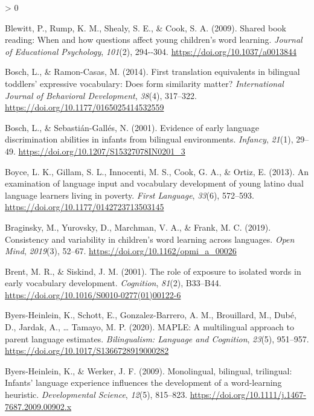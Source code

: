 \documentclass[
  english,
  ,man,floatsintext]{apa6}
\newlength{\cslhangindent}
\newenvironment{CSLReferences}[2] %
 {%
  \setlength{\parindent}{0pt}
  \ifodd #1 \everypar{\setlength{\hangindent}{\cslhangindent}}\ignorespaces\fi
  \ifnum #2 > 0
  \setlength{\parskip}{#2\baselineskip}
  \fi
 }%
 {}
\begin{document}
\begin{CSLReferences}{1}{0}
\leavevmode\hypertarget{ref-Blewitt_etal_2009}{}%
Blewitt, P., Rump, K. M., Shealy, S. E., \& Cook, S. A. (2009). Shared book reading: When and how questions affect young children's word learning. \emph{Journal of Educational Psychology}, \emph{101}(2), 294-\/-304. \url{https://doi.org/10.1037/a0013844}

\leavevmode\hypertarget{ref-Bosch_Ramon-Casas_2014}{}%
Bosch, L., \& Ramon-Casas, M. (2014). First translation equivalents in bilingual toddlers' expressive vocabulary: Does form similarity matter? \emph{International Journal of Behavioral Development}, \emph{38}(4), 317--322. \url{https://doi.org/10.1177/0165025414532559}

\leavevmode\hypertarget{ref-Bosch_Sebastian-Galles_2001}{}%
Bosch, L., \& Sebastián-Gallés, N. (2001). Evidence of early language discrimination abilities in infants from bilingual environments. \emph{Infancy}, \emph{21}(1), 29--49. \url{https://doi.org/10.1207/S15327078IN0201_3}

\leavevmode\hypertarget{ref-Boyce_etal_2013}{}%
Boyce, L. K., Gillam, S. L., Innocenti, M. S., Cook, G. A., \& Ortiz, E. (2013). An examination of language input and vocabulary development of young latino dual language learners living in poverty. \emph{First Language}, \emph{33}(6), 572--593. \url{https://doi.org/10.1177/0142723713503145}

\leavevmode\hypertarget{ref-Braginsky_etal_2019}{}%
Braginsky, M., Yurovsky, D., Marchman, V. A., \& Frank, M. C. (2019). Consistency and variability in children's word learning across languages. \emph{Open Mind}, \emph{2019}(3), 52--67. \url{https://doi.org/10.1162/opmi_a_00026}

\leavevmode\hypertarget{ref-Brent_Siskind_2001}{}%
Brent, M. R., \& Siskind, J. M. (2001). The role of exposure to isolated words in early vocabulary development. \emph{Cognition}, \emph{81}(2), B33--B44. \url{https://doi.org/10.1016/S0010-0277(01)00122-6}

\leavevmode\hypertarget{ref-Byers-Heinlein_etal_2020}{}%
Byers-Heinlein, K., Schott, E., Gonzalez-Barrero, A. M., Brouillard, M., Dubé, D., Jardak, A., \ldots{} Tamayo, M. P. (2020). MAPLE: A multilingual approach to parent language estimates. \emph{Bilingualism: Language and Cognition}, \emph{23}(5), 951--957. \url{https://doi.org/10.1017/S1366728919000282}

\leavevmode\hypertarget{ref-Byers-Heinlein_Werker_2009}{}%
Byers-Heinlein, K., \& Werker, J. F. (2009). Monolingual, bilingual, trilingual: Infants' language experience influences the development of a word-learning heuristic. \emph{Developmental Science}, \emph{12}(5), 815--823. \url{https://doi.org/10.1111/j.1467-7687.2009.00902.x}


\end{CSLReferences}
\end{document}
